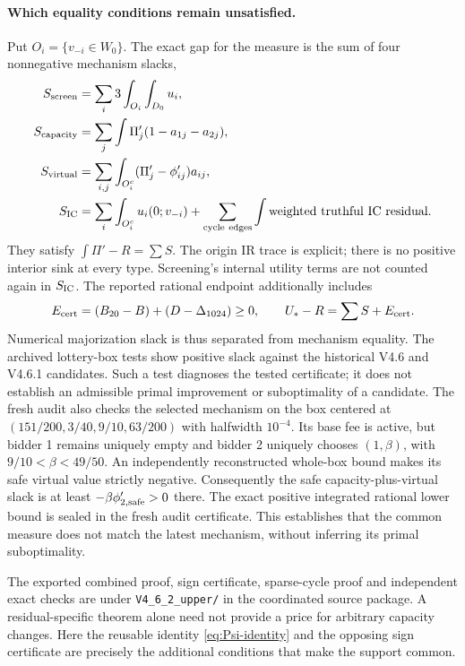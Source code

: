 \paragraph{Which equality conditions remain unsatisfied.}
Put $O_i=\{v_{-i}\in W_0\}$. The exact gap for the measure is the sum
of four nonnegative mechanism slacks,
\begin{align*}
 S_{\rm screen}&=\sum_i3\int_{O_i}\int_{D_0}u_i,\\
 S_{\rm capacity}&=\sum_j\int\Pi'_j(1-a_{1j}-a_{2j}),\\
 S_{\rm virtual}&=\sum_{i,j}\int_{O_i^c}(\Pi'_j-\phi'_{ij})a_{ij},\\
 S_{\rm IC}&=\sum_i\int_{O_i^c}u_i(0;v_{-i})
   +\sum_{\rm cycle\ edges}\int\text{weighted truthful IC residual}.
\end{align*}
They satisfy $\int\Pi'-R=\sum S$. The origin IR trace is explicit;
there is no positive interior sink at every type. Screening's internal
utility terms are not counted again in $S_{\rm IC}$.
The reported rational endpoint additionally includes
\[
 E_{\rm cert}=(B_{20}-B)+(D-\Delta_{1024})\ge0,
 \qquad U_*-R=\sum S+E_{\rm cert}.
\]
Numerical majorization slack is thus separated from mechanism equality.
The archived lottery-box tests show positive slack against the historical
V4.6 and V4.6.1 candidates. Such a test diagnoses the tested certificate;
it does not establish an admissible primal improvement or suboptimality
of a candidate. The fresh audit also checks the selected mechanism on the box centered
at $(151/200,3/40,9/10,63/200)$ with halfwidth $10^{-4}$. Its base fee
is active, but bidder 1 remains uniquely empty and bidder 2 uniquely
chooses $(1,\beta)$, with $9/10<\beta<49/50$. An independently
reconstructed whole-box bound makes its safe virtual value strictly
negative. Consequently the safe capacity-plus-virtual slack is at least
$-\beta\phi'_{2,\rm safe}>0$ there. The exact positive integrated
rational lower bound is sealed in the fresh audit certificate. This
establishes that the common measure does not match the latest mechanism,
without inferring its primal suboptimality.

The exported combined proof, sign certificate, sparse-cycle proof and
independent exact checks are under
\texttt{V4\_6\_2\_upper/} in the coordinated source package.
A residual-specific theorem alone need not provide a price for arbitrary
capacity changes. Here the reusable identity \eqref{eq:Psi-identity}
and the opposing sign certificate are precisely the additional conditions
that make the support common.
